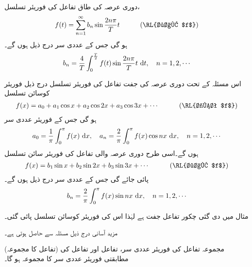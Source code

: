 دوری عرصہ  کی طاق تفاعل  کی فوریئر تسلسل، 
\begin{align}\label{مساوات_فوریئر_طاق_فوریئر_تسلسل}
f(t)=\sum_{n=1}^{\infty} b_n\sin \frac{2n\pi}{T}t\quad \quad \quad (\text{\RL{طاق $f$}})
\end{align}
 ہو گی جس کے عددی سر درج ذیل ہوں گے۔
\begin{align}\label{مساوات_فوریئر_طاق_تسلسل_عددی_سر}
b_n=\frac{4}{T}\int_{0}^{\frac{T}{2}}f(t)\sin \frac{2n\pi}{T}t\,\dif t,\quad n=1,2,\cdots
\end{align}

اس مسئلہ کے تحت دوری عرصہ  کی جفت تفاعل  کی فوریئر تسلسل درج ذیل فوریئر کوسائن تسلسل 
\begin{align}
f(x)=a_0+a_1\cos x+a_2\cos 2x+a_3\cos 3x+\cdots\quad \quad \quad (\text{\RL{جفت $f$}})
\end{align} 
ہو گی جس کے فوریئر عددی سر 
\begin{align}
a_0=\frac{1}{\pi}\int_0^{\pi}f(x)\,\dif x,\quad a_n=\frac{2}{\pi}\int_0^{\pi} f(x)\cos nx\,\dif x,\quad n=1,2,\cdots
\end{align}
ہوں گے۔اسی طرح دوری عرصہ  والی تفاعل  کی فوریئر سائن تسلسل 
\begin{align}
f(x)=b_1\sin x+b_2\sin 2x+b_3\sin 3x+\cdots\quad \quad \quad (\text{\RL{طاق $f$}})
\end{align}
پائی جائے گی جس کے عددی سر درج ذیل ہوں گے۔
\begin{align}
b_n=\frac{2}{\pi}\int_0^{\pi}f(x)\sin nx\,\dif x,\quad n=1,2,\cdots
\end{align}

مثال  میں دی گئی چکور تفاعل جفت ہے لہٰذا اس کی فوریئر کوسائن تسلسل پائی گئی۔ 

مزید آسانی درج ذیل مسئلہ سے حاصل ہوتی ہے۔

\quad (تفاعل کا مجموعہ)
مجموعہ تفاعل  کی فوریئر عددی سر،  تفاعل   اور تفاعل  کی مطابقتی فوریئر عددی سر کا مجموعہ ہو گا۔ 

